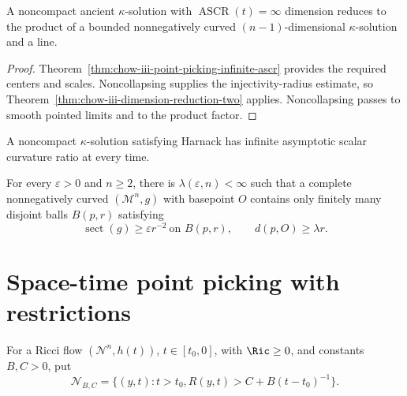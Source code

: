 \begin{corollary}
\label{cor:chow-iii-dimension-reduction-kappa-solutions}
A noncompact ancient \(\kappa\)-solution with
\(\operatorname{ASCR}(t)=\infty\) dimension reduces to the product of a
bounded nonnegatively curved \((n-1)\)-dimensional \(\kappa\)-solution and a
line.
\end{corollary}
\begin{proof}
\sketch Theorem~\ref{thm:chow-iii-point-picking-infinite-ascr} provides the required
centers and scales.  Noncollapsing supplies the injectivity-radius estimate,
so Theorem~\ref{thm:chow-iii-dimension-reduction-two} applies.  Noncollapsing
passes to smooth pointed limits and to the product factor.
\end{proof}

\begin{remark}
\label{rem:chow-iii-kappa-solution-harnack-ascr}
A noncompact \(\kappa\)-solution satisfying Harnack has infinite asymptotic
scalar curvature ratio at every time.
\end{remark}

\begin{theorem}
\label{thm:chow-iii-finite-remote-curvature-bumps}
For every \(\varepsilon>0\) and \(n\ge2\), there is
\(\lambda(\varepsilon,n)<\infty\) such that a complete nonnegatively curved
\((\mathcal M^n,g)\) with basepoint \(O\) contains only finitely many disjoint
balls \(B(p,r)\) satisfying
\[
 \operatorname{sect}(g)\ge\varepsilon r^{-2}\ \text{on }B(p,r),
 \qquad d(p,O)\ge\lambda r.
\]
\end{theorem}

\section{Space-time point picking with restrictions}

For a Ricci flow \((\mathcal N^n,h(t))\), \(t\in[t_0,0]\), with
\(\Ric\ge0\), and constants \(B,C>0\), put
\[
 \mathcal N_{B,C}=\{(y,t):t>t_0, R(y,t)>C+B(t-t_0)^{-1}\}.
\]

